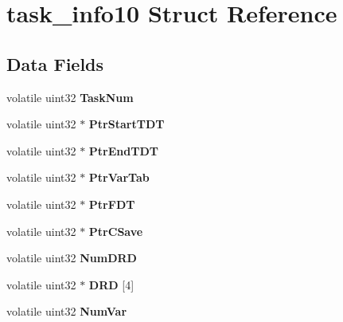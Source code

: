 \hypertarget{structtask__info10}{}\section{task\+\_\+info10 Struct Reference}
\label{structtask__info10}
\subsection*{Data Fields}
\begin{DoxyCompactItemize}
\item 
\mbox{\label{structtask__info10_a8d27351680898457fc6d9eccf5e9e0f2}} 
volatile uint32 {\bfseries Task\+Num}
\item 
\mbox{\label{structtask__info10_a1b628749ff6a19681b5182f0205416ae}} 
volatile uint32 $\ast$ {\bfseries Ptr\+Start\+T\+DT}
\item 
\mbox{\label{structtask__info10_a5221351dc754dc3114a299e84213fc0d}} 
volatile uint32 $\ast$ {\bfseries Ptr\+End\+T\+DT}
\item 
\mbox{\label{structtask__info10_af054825e8afcd0a51abdfd82e794b323}} 
volatile uint32 $\ast$ {\bfseries Ptr\+Var\+Tab}
\item 
\mbox{\label{structtask__info10_aa3814529d6f0618fc71541c3c8f5f9de}} 
volatile uint32 $\ast$ {\bfseries Ptr\+F\+DT}
\item 
\mbox{\label{structtask__info10_a503f216b0d2d565f1f1b3c9e316a8708}} 
volatile uint32 $\ast$ {\bfseries Ptr\+C\+Save}
\item 
\mbox{\label{structtask__info10_a1fdb93c3eb9d76994cf9377c58804285}} 
volatile uint32 {\bfseries Num\+D\+RD}
\item 
\mbox{\label{structtask__info10_aace26bcca1569261249fbfdfb7f884bb}} 
volatile uint32 $\ast$ {\bfseries D\+RD} \mbox{[}4\mbox{]}
\item 
\mbox{\label{structtask__info10_a0ad4ae7dd646046ac00f64c4efc2a780}} 
volatile uint32 {\bfseries Num\+Var}

\end{DoxyCompactItemize}
